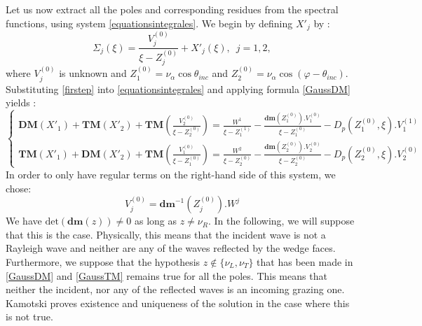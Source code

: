 Let us now extract all the poles and corresponding residues from the spectral functions, using system \eqref{equationsintegrales}. We begin by defining $X'_j$ by :
\begin{equation}
\Sigma_j(\xi)= \frac{V_j^{(0)}}{\xi-Z^{(0)}_j}+X'_j(\xi), \, \, \, j=1,2,
\label{firstep}
\end{equation}
where $V_j^{(0)}$ is unknown and $Z_1^{(0)}=\nu_{\alpha} \cos \theta_{inc}$  and $Z_2^{(0)}=\nu_{\alpha} \cos(\varphi-\theta_{inc})$. Substituting \eqref{firstep} into \eqref{equationsintegrales} and applying formula \eqref{GaussDM} yields :
\begin{equation}
\left\{
\begin{matrix}
\textbf{DM}(X'_1)+\textbf{TM}(X'_2)+\textbf{TM}(\frac{V_2^{(0)}}{\xi-Z_2^{(0)}})=\frac{W^1}{\xi-Z_1^{(1)}}-\frac{\textbf{dm}(Z_1^{(0)}).V_1^{(0)}}{\xi-Z_1^{(0)}}-D_p(Z_1^{(0)},\xi).V_1^{(1)}\\
\textbf{TM}(X'_1)+\textbf{DM}(X'_2)+\textbf{TM}(\frac{V_1^{(0)}}{\xi-Z_1^{(0)}})=\frac{W^2}{\xi-Z_2^{(0)}}-\frac{\textbf{dm}(Z_2^{(0)}).V_2^{(0)}}{\xi-Z_2^{(0)}}-D_p(Z_2^{(0)},\xi).V_2^{(0)}
\end{matrix}
\right.
\end{equation}
In order to only have regular terms on the right-hand side of this system, we chose:
\begin{equation}
V_j^{(0)}=\textbf{dm}^{-1}(Z_j^{(0)}).W^j
\end{equation}
We have $\mbox{det}(\textbf{dm}(z) )\neq 0$ as long as $z\neq \nu_R$. In the following, we will suppose that this is the case. Physically, this means that the incident wave is not a Rayleigh wave and neither are any of the waves reflected by the wedge faces. Furthermore, we suppose that the hypothesis $z \notin \{ \nu_L, \nu_T\}$ that has been made in \eqref{GaussDM} and \eqref{GaussTM} remains true for all the poles. This means that neither the incident, nor any of the reflected waves is an incoming grazing one. Kamotski \cite{KamotskiCrit} proves existence and uniqueness of the solution in the case where this is not true.

